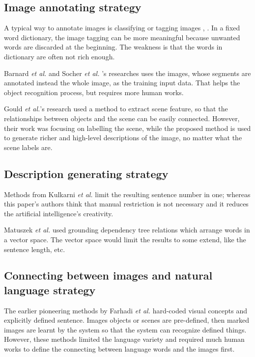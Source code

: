 \documentclass[10pt,twocolumn,letterpaper]{article}
\begin{document}
\subsection{Image annotating strategy}
A typical way to annotate images is classifying or tagging images \cite{everingham}, \cite{russakovsky}.
In a fixed word dictionary, the image tagging can be more meaningful because unwanted words are discarded at the beginning.
The weakness is that the words in dictionary are often not rich enough.

Barnard \textit{et al.} \cite{barnard} and Socher \textit{et al.} \cite{socher}'s researches uses the images,
whose segments are annotated instead the whole image, as the training input data.
That helps the object recognition process, but requires more human works.

Gould \textit{et al.}'s research \cite {gould} used a method to extract scene feature,
so that the relationships between objects and the scene can be easily connected.
However, their work was focusing on labelling the scene, while the proposed method is used to
generate richer and high-level descriptions of the image, no matter what the scene labels are.


\subsection{Description generating strategy}
Methods from Kulkarni \textit{et al.} \cite{kulkarni} limit the resulting sentence number in one;
whereas this paper's authors think that manual restriction is not necessary and it reduces the artificial intelligence's creativity.

Matuszek \textit{et al.} \cite{matuszek} used grounding dependency tree relations which arrange words in a vector space.
The vector space would limit the results to some extend, like the sentence length, etc.


\subsection{Connecting between images and natural language strategy}
The earlier pioneering methods by Farhadi \textit{et al.} \cite{farhadi} hard-coded visual concepts and explicitly defined sentence.
Images objects or scenes are pre-defined, then marked images are learnt by the system so that the system can recognize defined things.
However, these methods limited the language variety and required much human works to define the connecting between language words and the images first.
\end{document}
